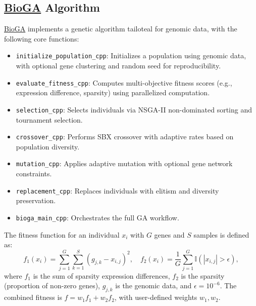 \documentclass{report}
\begin{document}
\subsection{\textcolor{teal}{\href{https://bioconductor.org/packages/release/bioc/html/BioGA.html}{BioGA}} Algorithm}
\textcolor{teal}{\href{https://bioconductor.org/packages/release/bioc/html/BioGA.html}{BioGA}} implements a genetic algorithm tailoteal for genomic data, with the following core functions:
\begin{itemize}
    \item \texttt{initialize\_population\_cpp}: Initializes a population using genomic data, with optional gene clustering and random seed for reproducibility.
    \item \texttt{evaluate\_fitness\_cpp}: Computes multi-objective fitness scores (e.g., expression difference, sparsity) using parallelized computation.
    \item \texttt{selection\_cpp}: Selects individuals via NSGA-II non-dominated sorting and tournament selection.
    \item \texttt{crossover\_cpp}: Performs SBX crossover with adaptive rates based on population diversity.
    \item \texttt{mutation\_cpp}: Applies adaptive mutation with optional gene network constraints.
    \item \texttt{replacement\_cpp}: Replaces individuals with elitism and diversity preservation.
    \item \texttt{bioga\_main\_cpp}: Orchestrates the full GA workflow.
\end{itemize}

The fitness function for an individual \( x_i \) with \( G \) genes and \( S \) samples is defined as:
\begin{equation}
    f_1(x_i) = \sum_{j=1}^G \sum_{k=1}^S (g_{j,k} - x_{i,j})^2, \quad f_2(x_i) = \frac{1}{G} \sum_{j=1}^G \mathbb{I}(|x_{i,j}| > \epsilon),
\end{equation}
where \( f_1 \) is the sum of sparsity expression differences, \( f_2 \) is the sparsity (proportion of non-zero genes), \( g_{j,k} \) is the genomic data, and \( \epsilon = 10^{-6} \). The combined fitness is \( f = w_1 f_1 + w_2 f_2 \), with user-defined weights \( w_1, w_2 \).
\end{document}
